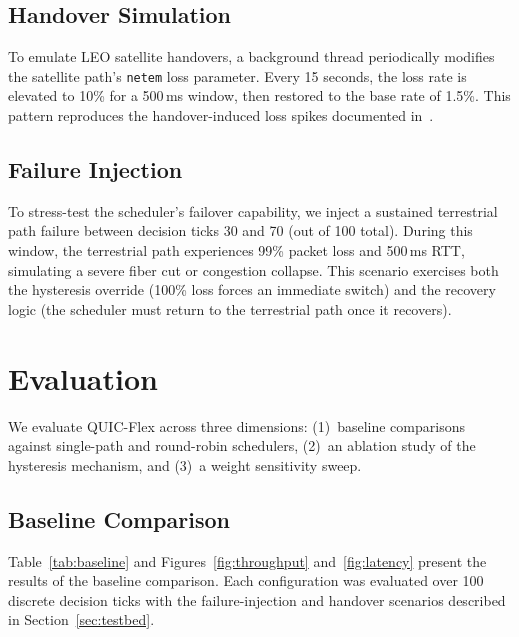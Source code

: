 \documentclass[conference,10pt]{IEEEtran}
\begin{document}
\subsection{Handover Simulation}

To emulate LEO satellite handovers, a background thread periodically modifies the satellite path's \texttt{netem} loss parameter.
Every 15 seconds, the loss rate is elevated to 10\% for a 500\,ms window, then restored to the base rate of 1.5\%.
This pattern reproduces the handover-induced loss spikes documented in~\cite{mohan2026starlinkv2}.

\subsection{Failure Injection}

To stress-test the scheduler's failover capability, we inject a sustained terrestrial path failure between decision ticks 30 and 70 (out of 100 total).
During this window, the terrestrial path experiences 99\% packet loss and 500\,ms RTT, simulating a severe fiber cut or congestion collapse.
This scenario exercises both the hysteresis override (100\% loss forces an immediate switch) and the recovery logic (the scheduler must return to the terrestrial path once it recovers).

\section{Evaluation}
\label{sec:evaluation}

We evaluate QUIC-Flex across three dimensions: (1)~baseline comparisons against single-path and round-robin schedulers, (2)~an ablation study of the hysteresis mechanism, and (3)~a weight sensitivity sweep.

\subsection{Baseline Comparison}

Table~\ref{tab:baseline} and Figures~\ref{fig:throughput} and~\ref{fig:latency} present the results of the baseline comparison.
Each configuration was evaluated over 100 discrete decision ticks with the failure-injection and handover scenarios described in Section~\ref{sec:testbed}.
\end{document}

